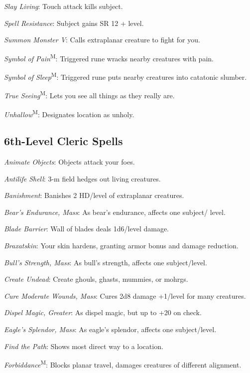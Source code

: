 \textit{Slay Living}: Touch attack kills subject.

\textit{Spell Resistance}: Subject gains SR 12 + level.

\textit{Summon Monster V}: Calls extraplanar creature to fight for you.

\textit{Symbol of Pain}\textsuperscript{M}: Triggered rune wracks nearby creatures with pain.

\textit{Symbol of Sleep}\textsuperscript{M}: Triggered rune puts nearby creatures into catatonic slumber.

\textit{True Seeing}\textsuperscript{M}: Lets you see all things as they really are.

\textit{Unhallow}\textsuperscript{M}: Designates location as unholy.




\subsection{6th-Level Cleric Spells}

\textit{Animate Objects}: Objects attack your foes.

\textit{Antilife Shell}: 3-m field hedges out living creatures.

\textit{Banishment}: Banishes 2 HD/level of extraplanar creatures.

\textit{Bear's Endurance, Mass}: As bear's endurance, affects one subject/ level.

\textit{Blade Barrier}: Wall of blades deals 1d6/level damage.

\textit{Braxatskin}: Your skin hardens, granting armor bonus and damage reduction.

\textit{Bull's Strength, Mass}: As bull's strength, affects one subject/level.

\textit{Create Undead}: Create ghouls, ghasts, mummies, or mohrgs.

\textit{Cure Moderate Wounds, Mass}: Cures 2d8 damage +1/level for many creatures.

\textit{Dispel Magic, Greater}: As dispel magic, but up to +20 on check.

\textit{Eagle's Splendor, Mass}: As eagle's splendor, affects one subject/level.

\textit{Find the Path}: Shows most direct way to a location.

\textit{Forbiddance}\textsuperscript{M}: Blocks planar travel, damages creatures of different alignment.

